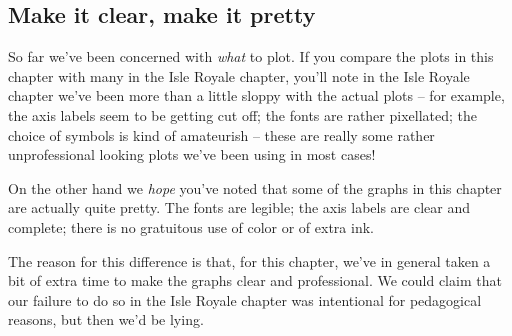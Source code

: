 \subsection{Make it clear, make it pretty}

So far we've been concerned with {\it what} to plot. If you compare the  plots in this chapter with many in the Isle Royale chapter, you'll note in the Isle Royale chapter we've been more than a little sloppy with the actual plots -- for example, the axis labels seem to be getting cut off; the fonts are rather pixellated; the choice of symbols is kind of amateurish -- these are really some rather unprofessional looking plots we've been using in most cases!

On the other hand we {\it hope} you've noted that some of the graphs in this chapter are actually quite pretty.  The fonts are legible; the axis labels are clear and complete; there is no gratuitous use of color or of extra ink.  

The reason for this difference is that, for this chapter, we've in general taken a bit of extra time to make the graphs clear and professional.  We could claim that our failure to do so in the Isle Royale chapter was intentional for pedagogical reasons, but then we'd be lying.  

